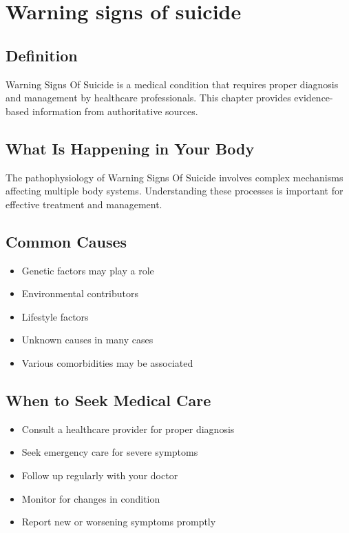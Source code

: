 
\chapter{Warning signs of suicide}

\section*{Definition}
Warning Signs Of Suicide is a medical condition that requires proper diagnosis and management by healthcare professionals. This chapter provides evidence-based information from authoritative sources.

\section*{What Is Happening in Your Body}
The pathophysiology of Warning Signs Of Suicide involves complex mechanisms affecting multiple body systems. Understanding these processes is important for effective treatment and management.

\section*{Common Causes}
\begin{itemize}
  \item Genetic factors may play a role
  \item Environmental contributors
  \item Lifestyle factors
  \item Unknown causes in many cases
  \item Various comorbidities may be associated
\end{itemize}

\section*{When to Seek Medical Care}
\begin{itemize}
  \item Consult a healthcare provider for proper diagnosis
  \item Seek emergency care for severe symptoms
  \item Follow up regularly with your doctor
  \item Monitor for changes in condition
  \item Report new or worsening symptoms promptly
\end{itemize}

